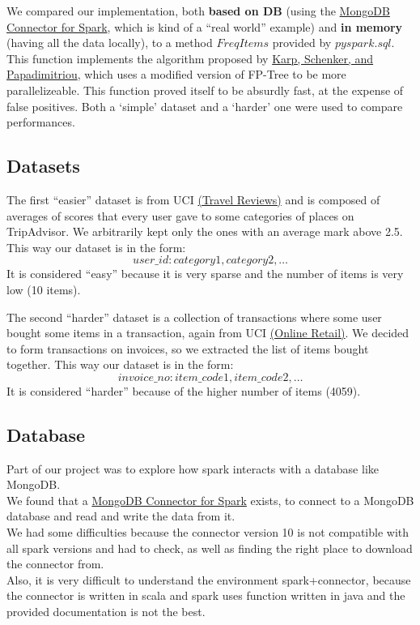 \documentclass[a4paper]{article}
\begin{document}
	We compared our implementation, both \textbf{based on DB} (using the \href{https://www.mongodb.com/docs/spark-connector/current/}{MongoDB Connector for Spark}, which is kind of a ``real world'' example) and \textbf{in memory} (having all the data locally), to a method $FreqItems$ provided by $pyspark.sql$. 
	This function implements the algorithm proposed by \href{https://doi.org/10.1145/762471.762473}{Karp, Schenker, and Papadimitriou}, which uses a modified version of FP-Tree to be more parallelizeable. This function proved itself to be absurdly fast, at the expense of false positives.
	Both a  `simple' dataset and a `harder' one were used to compare performances.

	\subsection{Datasets}
	The first ``easier'' dataset is from UCI \href{https://archive.ics.uci.edu/ml/datasets/Travel+Reviews#}{(Travel Reviews)} and is composed of averages of scores that every user gave to some
	categories of places on TripAdvisor. We arbitrarily kept only the ones with an average mark above 2.5. This way our dataset is in the form:
	\[ user\_id: category1, category2, \ldots \]
	It is considered ``easy'' because it is very sparse and the number of items is very low (10 items).

	The second ``harder'' dataset is a collection of transactions where some user bought some items in a transaction, again from UCI \href{https://archive.ics.uci.edu/ml/datasets/online+retail}{(Online Retail)}.
	We decided to form transactions on invoices, so we extracted the list of items bought together.
	This way our dataset is in the form:
	\[ invoice\_no: item\_code1, item\_code2, \ldots \]
	It is considered ``harder'' because of the higher number of items (4059).

	\subsection{Database}
	Part of our project was to explore how spark interacts with a database like MongoDB.\\
	We found that a \href{https://www.mongodb.com/docs/spark-connector/current/}{MongoDB Connector for Spark} exists, to connect to a MongoDB database and read and write the data from it.\\
	We had some difficulties because the connector version 10 is not compatible with all spark versions and had to check, as well as finding the right place to download the connector from.\\
	Also, it is very difficult to understand the environment spark+connector, because the connector is written in scala and spark uses function written in java and the provided documentation is not the best.\\
	
\end{document}
